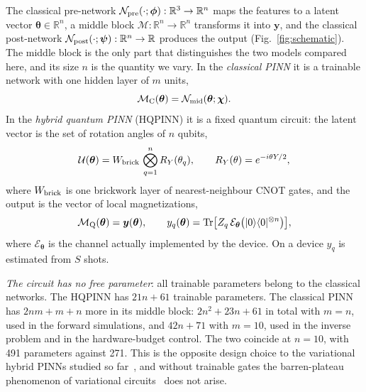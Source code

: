 \documentclass[floatfix,aps,pra,twocolumn,superscriptaddress,10pt,nofootinbib]{revtex4-2}
\begin{document}
The classical pre-network $\mathcal N_{\rm pre}(\cdot;\bm\phi):\mathbb R^3\to\mathbb R^n$ maps the features to a latent vector $\bm\theta\in\mathbb R^n$, a middle block $\mathcal M:\mathbb R^n\to\mathbb R^n$ transforms it into $\bm y$, and the classical post-network $\mathcal N_{\rm post}(\cdot;\bm\psi):\mathbb R^n\to\mathbb R$ produces the output (Fig.~\ref{fig:schematic}). The middle block is the only part that distinguishes the two models compared here, and its size $n$ is the quantity we vary. In the \emph{classical PINN} it is a trainable network with one hidden layer of $m$ units,
\begin{equation}
  \mathcal M_{\rm C}(\bm\theta)=\mathcal N_{\rm mid}(\bm\theta;\bm\chi).
  \label{eq:bottleneck}
\end{equation}
In the \emph{hybrid quantum PINN} (HQPINN) it is a fixed quantum circuit: the latent vector is the set of rotation angles of $n$ qubits,
\begin{equation}
  \mathcal U(\bm\theta)=W_{\rm brick}\,\bigotimes_{q=1}^{n}R_Y(\theta_q),\qquad R_Y(\theta)=e^{-i\theta Y/2},
  \label{eq:circuit}
\end{equation}
where $W_{\rm brick}$ is one brickwork layer of nearest-neighbour CNOT gates, and the output is the vector of local magnetizations,
\begin{equation}
  \mathcal M_{\rm Q}(\bm\theta)=\bm y(\bm\theta),\qquad y_q(\bm\theta)=\operatorname{Tr}\!\big[Z_q\,\mathcal E_{\bm\theta}\big(|0\rangle\langle0|^{\otimes n}\big)\big],
  \label{eq:expval}
\end{equation}
where $\mathcal E_{\bm\theta}$ is the channel actually implemented by the device. On a device $y_q$ is estimated from $S$ shots.

\emph{The circuit has no free parameter}: all trainable parameters belong to the classical networks. The HQPINN has $21n+61$ trainable parameters. The classical PINN has $2nm+m+n$ more in its middle block: $2n^2+23n+61$ in total with $m=n$, used in the forward simulations, and $42n+71$ with $m=10$, used in the inverse problem and in the hardware-budget control. The two coincide at $n=10$, with 491 parameters against 271. This is the opposite design choice to the variational hybrid PINNs studied so far~\cite{sedykh2024hybrid,berger2025trainable,farea2025qcpinn,lantigua2026classical,zabihi2026hybrid}, and without trainable gates the barren-plateau phenomenon of variational circuits~\cite{mcclean2018barren,cerezo2021cost} does not arise.
\end{document}
